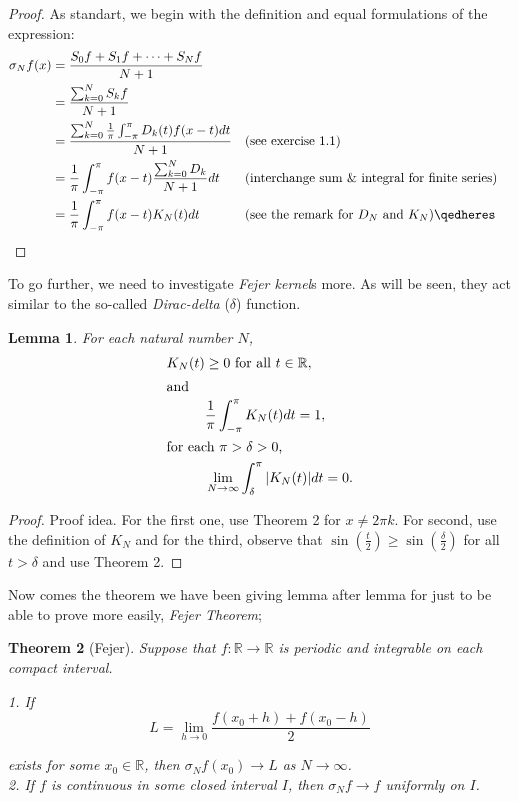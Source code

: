 \documentclass[12pt]{amsart}
\newtheorem{theorem}{Theorem}[section]
\newtheorem{lemma}[theorem]{Lemma}
\theoremstyle{definition}
\begin{document}
\begin{proof} As standart, we begin with the definition and equal formulations of the expression:
    \begin{align*}
    \sigma_Nf(x) &= \frac{S_0f + S_1f + \dots + S_Nf}{N+1}\\
                 &= \frac{\sum_{k = 0}^{N}S_kf}{N+1} \\
                 &= \frac{\sum_{k = 0}^{N}\frac{1}{\pi}\int_{-\pi}^{\pi}D_k(t)f(x-t)dt}{N+1} &&\text{(see exercise 1.1)}\\
                 &= \frac{1}{\pi}\int_{-\pi}^{\pi}f(x-t)\frac{\sum_{k = 0}^{N}D_k}{N+1}dt &&\text{(interchange sum \& integral for finite series)}\\
                 &= \frac{1}{\pi}\int_{-\pi}^{\pi}f(x-t)K_N(t)dt &&\text{(see the remark for $D_N$ and $K_N$)}\qedheres
    \end{align*}
\end{proof}


\par
To go further, we need to investigate \textit{Fejer kernel}s more. As will be seen, they act similar to the so-called \textit{Dirac-delta} ($\delta$) function.


\begin{lemma}
    For each natural number $N$,
    \begin{align}
        K_N(t) &\geq 0 \text{ for all } t \in \mathbb{R},\\
        \intertext{and}
        &\frac{1}{\pi}\int_{-\pi}^{\pi} K_N(t)dt = 1,\\
        \intertext{for each  $\pi > \delta > 0$,}
        &\lim_{N \to \infty} \int_{\delta}^{\pi}|K_N(t)|dt = 0.
    \end{align}
\end{lemma}


\begin{proof}{Proof idea.}
    For the first one, use Theorem 2 for $x \neq 2\pi k$. For second, use the definition of $K_N$ and for the third, observe that $\sin(\frac{t}{2}) \geq \sin(\frac{\delta}{2})$ for all $t > \delta$ and use Theorem 2.
\end{proof}


Now comes the theorem we have been giving lemma after lemma for just to be able to prove more easily, \textit{Fejer Theorem};


\begin{theorem}[Fejer]
    Suppose that $f: \mathbb{R} \to \mathbb{R}$ is periodic and integrable on each compact interval.


     


        1. If \begin{equation}
             L = \lim_{h \to 0} \frac{f(x_0 + h) + f(x_0 - h)}{2}
        \end{equation}

        exists for some $x_0 \in \mathbb{R}$, then $\sigma_Nf(x_0) \to L$ as $N \to \infty$.   \\
        2. If \(f\) is continuous in some closed interval $I$, then $\sigma_Nf \to f$ uniformly on $I$.

\end{theorem}
\end{document}
